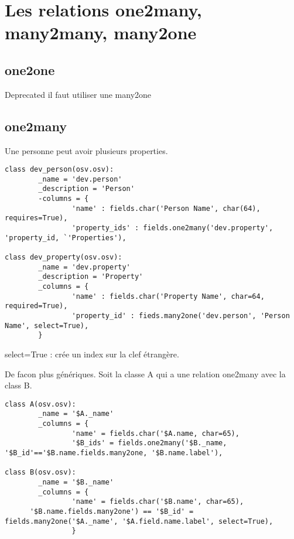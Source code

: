 \documentclass[12pt,a4paper]{article}
\begin{document}
\section{Les relations one2many, many2many, many2one}
\label{sec:relations}

\subsection{one2one}
\label{sec:one2one}

Deprecated il faut utiliser une many2one

\subsection{one2many}
\label{sec:one2m}

Une personne peut avoir plusieurs properties.

\begin{verbatim}
class dev_person(osv.osv):
        _name = 'dev.person'
        _description = 'Person'
        -columns = {
                'name' : fields.char('Person Name', char(64), requires=True),
                'property_ids' : fields.one2many('dev.property', 'property_id, `'Properties'),

class dev_property(osv.osv):
        _name = 'dev.property'
        _description = 'Property'
        _columns = {
                'name' : fields.char('Property Name', char=64, required=True),
                'property_id' : fieds.many2one('dev.person', 'Person Name', select=True),
        }
\end{verbatim}

select=True : crée un index sur la clef étrangère.

De facon plus génériques. Soit la classe A qui a une relation one2many avec la class B.

\footnotesize{
\begin{verbatim}
class A(osv.osv):
        _name = '$A._name'
        _columns = {
                'name' = fields.char('$A.name, char=65),
                '$B_ids' = fields.one2many('$B._name, '$B_id'=='$B.name.fields.many2one, '$B.name.label'),

class B(osv.osv):
        _name = '$B._name'
        _columns = {
                'name' = fields.char('$B.name', char=65),
      '$B.name.fields.many2one') == '$B_id' = fields.many2one('$A._name', '$A.field.name.label', select=True),
                }
\end{verbatim}
}
\end{document}
